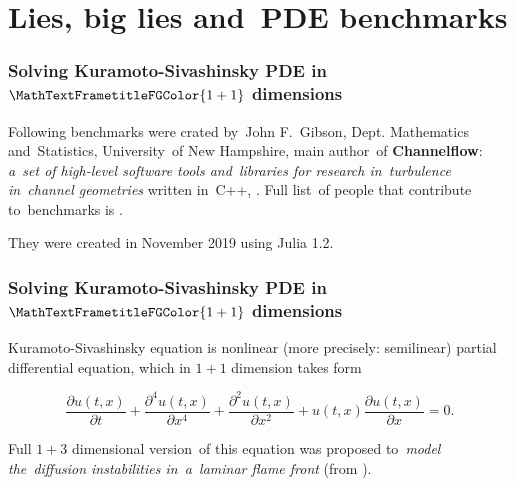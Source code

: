 \documentclass[10pt,t]{beamer}
\begin{document}
\section{Lies, big lies and~PDE benchmarks}



\begin{frame}
  \frametitle{Solving Kuramoto-Sivashinsky PDE
    in~$\MathTextFrametitleFGColor{1 + 1}$ dimensions}


  Following benchmarks were crated by~John F.~Gibson, Dept.
  Mathematics and~Statistics, University~of New Hampshire, main
  author~of \textbf{Channelflow}: \textit{a~set of high-level software
    tools and~libraries for research in~turbulence in~channel
    geometries} written in~C++,
  .
  Full list~of people that contribute to~benchmarks is
  .

  They were created in November 2019 using Julia 1.2.

\end{frame}





\begin{frame}
  \frametitle{Solving Kuramoto-Sivashinsky PDE
    in~$\MathTextFrametitleFGColor{1 + 1}$ dimensions}


  Kuramoto-Sivashinsky equation is nonlinear (more precisely:
  semilinear) partial differential equation, which in $1 + 1$
  dimension takes form

  \begin{equation}
    \label{eq:Julia-Proposition-01}
    \frac{ \partial u( t, x ) }{ \partial t }
    + \frac{ \partial^{ 4 } u( t, x ) }{ \partial x^{ 4 } }
    + \frac{ \partial^{ 2 } u( t, x ) }{ \partial x^{ 2 } }
    + u( t, x ) \frac{ \partial u( t, x ) }{ \partial x }
    = 0.
  \end{equation}


  Full $1 + 3$ dimensional version~of this equation was proposed
  to~\textit{model the~diffusion instabilities in~a~laminar flame
    front}
  (from
  ).

\end{frame}
\end{document}
